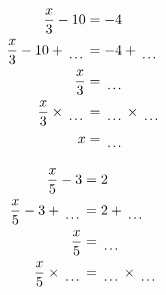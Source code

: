\documentclass[12pt]{article}
\newcounter{minipagecount}
\begin{document}
\begin{multicols}{2}
\begin{minipage}[t]{0.45\textwidth}
    \raggedright %
    \begin{align*} %
        \frac{x}{3} - 10 &= -4\\
        \frac{x}{3} - 10 + \dotuline{\hspace{5mm}} &= -4 + \dotuline{\hspace{5mm}}\\
        \frac{x}{3} &= \dotuline{\hspace{5mm}}\\
        \frac{x}{3} \times\dotuline{\hspace{5mm}} &= \dotuline{\hspace{5mm}} \times\dotuline{\hspace{5mm}}\\
        x &= \dotuline{\hspace{5mm}}\\
    \end{align*}
\end{minipage}\columnbreak
\noindent{(\theminipagecount)}\hspace{0.1mm} %
\begin{minipage}[t]{0.45\textwidth} %
    \vspace{-26pt}  %
    \raggedright %
    \begin{align*} %
        \frac{x}{5} - 3 &= 2\\
        \frac{x}{5} - 3 + \dotuline{\hspace{5mm}} &= 2 + \dotuline{\hspace{5mm}}\\
        \frac{x}{5} &= \dotuline{\hspace{5mm}}\\
        \frac{x}{5} \times\dotuline{\hspace{5mm}} &= \dotuline{\hspace{5mm}} \times\dotuline{\hspace{5mm}}\\

\end{align*}
\end{minipage}
\end{multicols}
\end{document}
